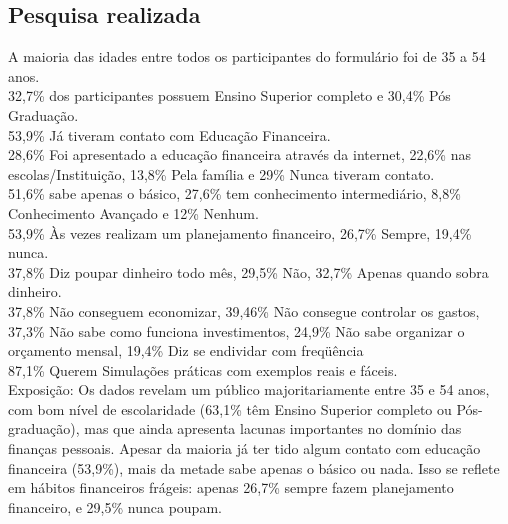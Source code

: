 \documentclass[
	article,			%
	12pt,				%
	oneside,			%
	a4paper,			%
	english,			%
	brazil,				%
	sumario=tradicional
	]{abntex2}
\begin{document}



%
%


\newpage
\begin{apendicesenv}

\chapter{Pesquisa realizada}
    A maioria das idades entre todos os participantes do formulário foi de 35 a 54 anos.\\ 
    32,7\%  dos participantes possuem Ensino Superior completo e 30,4\% Pós Graduação. \\
    53,9\%  Já tiveram contato com Educação Financeira. \\
    28,6\%  Foi apresentado a educação financeira através da internet, 22,6\% nas escolas/Instituição, 13,8\% Pela família e 29\% Nunca tiveram contato. \\
    51,6\%  sabe apenas o básico, 27,6\% tem conhecimento intermediário, 8,8\% Conhecimento  Avançado e 12\% Nenhum. \\
    53,9\% Às vezes realizam um planejamento financeiro, 26,7\% Sempre, 19,4\% nunca. \\
    37,8\% Diz poupar dinheiro todo mês, 29,5\% Não, 32,7\% Apenas quando sobra dinheiro. \\
    37,8\% Não conseguem economizar, 39,46\% Não consegue controlar os gastos, 37,3\% Não sabe como funciona investimentos, 24,9\% Não sabe organizar o orçamento mensal,  19,4\% Diz se endividar com freqüência \\
    87,1\% Querem Simulações práticas com exemplos reais e fáceis. \\
    Exposição: 
    Os dados revelam um público majoritariamente entre 35 e 54 anos, com bom nível de  escolaridade (63,1\% têm Ensino Superior completo ou Pós-graduação), mas que ainda apresenta lacunas importantes no domínio das finanças pessoais. Apesar da maioria já ter tido algum contato com educação financeira (53,9\%), mais da metade sabe apenas o básico ou nada. Isso se reflete em hábitos financeiros frágeis: apenas 26,7\% sempre fazem planejamento financeiro, e 29,5\% nunca poupam. 

\end{apendicesenv}
\end{document}
